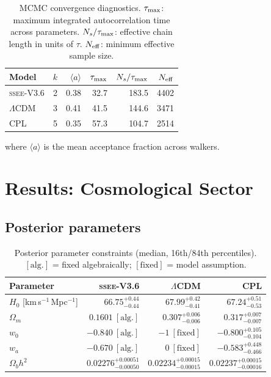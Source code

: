 \documentclass[12pt,a4paper]{article}
\newcommand{\SSEE}{\ifmmode\mathrm{SSEE}\else\textsc{ssee}\fi}
\newcommand{\LCDM}{\ifmmode\Lambda\mathrm{CDM}\else$\Lambda$CDM\fi}
\newcommand{\wz}{w_0}
\newcommand{\wa}{w_a}
\begin{document}
\begin{table}[H]
\centering
\caption{MCMC convergence diagnostics. $\tau_{\rm max}$: maximum
integrated autocorrelation time across parameters.
$N_s/\tau_{\rm max}$: effective chain length in units of $\tau$.
$N_{\rm eff}$: minimum effective sample size.}
\label{tab:convergence}
\begin{tabular}{lrrrrr}
\toprule
Model & $k$ & $\langle a\rangle$ & $\tau_{\rm max}$ & $N_s/\tau_{\rm max}$ & $N_{\rm eff}$ \\
\midrule
\SSEE-V3.6 & 2 & 0.38 & 32.7 & 183.5 & 4402 \\
\LCDM      & 3 & 0.41 & 41.5 & 144.6 & 3471 \\
CPL        & 5 & 0.35 & 57.3 & 104.7 & 2514 \\
\bottomrule
\end{tabular}
\end{table}
\noindent where $\langle a\rangle$ is the mean acceptance fraction across walkers.

\section{Results: Cosmological Sector}
\label{sec:results_cosmo}

\subsection{Posterior parameters}

\begin{table}[H]
\centering
\caption{Posterior parameter constraints (median, 16th/84th percentiles).
$[\mathrm{alg.}]$ = fixed algebraically; $[\mathrm{fixed}]$ = model assumption.}
\label{tab:posteriors}
\begin{tabular}{lrrr}
\toprule
Parameter & \SSEE-V3.6 & \LCDM & CPL \\
\midrule
$H_0$ [km\,s$^{-1}$\,Mpc$^{-1}$]
  & $66.75^{+0.44}_{-0.44}$
  & $67.99^{+0.42}_{-0.41}$
  & $67.24^{+0.51}_{-0.53}$ \\[3pt]
$\Omega_m$
  & $0.1601\ [\mathrm{alg.}]$
  & $0.307^{+0.006}_{-0.006}$
  & $0.317^{+0.007}_{-0.007}$ \\[3pt]
$\wz$
  & $-0.840\ [\mathrm{alg.}]$
  & $-1\ [\mathrm{fixed}]$
  & $-0.800^{+0.105}_{-0.104}$ \\[3pt]
$\wa$
  & $-0.670\ [\mathrm{alg.}]$
  & $0\ [\mathrm{fixed}]$
  & $-0.583^{+0.448}_{-0.466}$ \\[3pt]
$\Omega_b h^2$
  & $0.02276^{+0.00051}_{-0.00050}$
  & $0.02234^{+0.00015}_{-0.00015}$
  & $0.02237^{+0.00015}_{-0.00016}$ \\
\bottomrule
\end{tabular}
\end{table}
\end{document}
